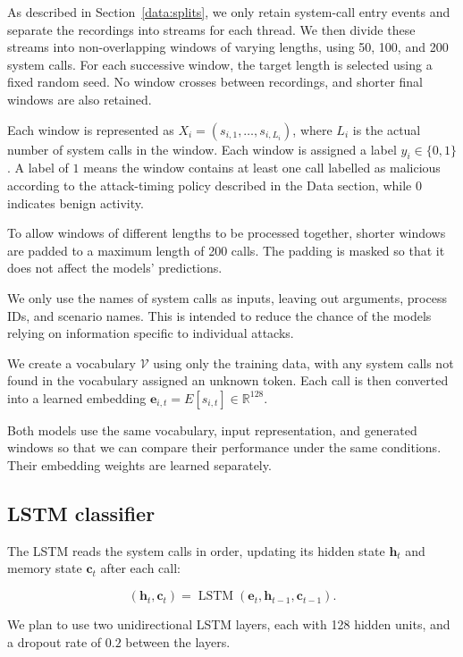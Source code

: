 \documentclass{article}
\begin{document}
As described in Section~\ref{data:splits}, we only retain
system-call entry events and separate the recordings into
streams for each thread. We then divide these streams into
non-overlapping windows of varying lengths, using 50, 100,
and 200 system calls. For each successive window, the target
length is selected using a fixed random seed. No window
crosses between recordings, and shorter final windows are
also retained.

Each window is represented as
$X_i=(s_{i,1},\ldots,s_{i,L_i})$,
where $L_i$ is the actual number of system calls in the
window. Each window is assigned a label $y_i\in\{0,1\}$.
A label of $1$ means the window contains at least one
call labelled as malicious according to the attack-timing
policy described in the Data section, while $0$ indicates
benign activity.

To allow windows of different lengths to be processed
together, shorter windows are padded to a maximum length
of 200 calls. The padding is masked so that it does not
affect the models' predictions.

We only use the names of system calls as inputs, leaving
out arguments, process IDs, and scenario names. This is
intended to reduce the chance of the models relying on
information specific to individual attacks.

We create a vocabulary $\mathcal V$ using only the training
data, with any system calls not found in the vocabulary
assigned an unknown token. Each call is then converted
into a learned embedding
$\mathbf e_{i,t}=E[s_{i,t}]\in\mathbb R^{128}$.

Both models use the same vocabulary, input representation,
and generated windows so that we can compare their
performance under the same conditions. Their embedding
weights are learned separately.

\subsection{LSTM classifier}
\label{model:lstm}

The LSTM reads the system calls in order, updating its
hidden state $\mathbf h_t$ and memory state $\mathbf c_t$
after each call:

\begin{equation}
(\mathbf h_t,\mathbf c_t)
=\operatorname{LSTM}(\mathbf e_t,\mathbf h_{t-1},
\mathbf c_{t-1}).
\end{equation}

We plan to use two unidirectional LSTM layers, each with
128 hidden units, and a dropout rate of $0.2$ between
the layers.
\end{document}
